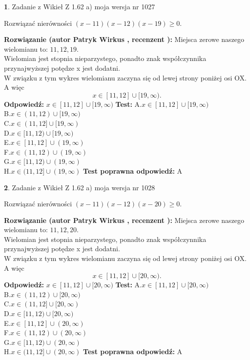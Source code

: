 \documentclass[12pt, a4paper]{article}
\theoremstyle{definition} %
\newtheorem{zad}{}
\newcommand{\zadStart}[1]{\begin{zad}#1\newline}
\newcommand{\zadStop}{\end{zad}}
\newcommand{\rozwStart}[2]{\noindent \textbf{Rozwiązanie (autor #1 , recenzent #2): }\newline}
\newcommand{\rozwStop}{\newline}
\newcommand{\odpStart}{\noindent \textbf{Odpowiedź:}\newline}
\newcommand{\odpStop}{\newline}
\newcommand{\testStart}{\noindent \textbf{Test:}\newline}
\newcommand{\testStop}{\newline}
\newcommand{\kluczStart}{\noindent \textbf{Test poprawna odpowiedź:}\newline}
\newcommand{\kluczStop}{\newline}
\begin{document}
\zadStart{Zadanie z Wikieł Z 1.62 a) moja wersja nr 1027}

Rozwiązać nierówności $(x-11)(x-12)(x-19)\ge0$.
\zadStop
\rozwStart{Patryk Wirkus}{}
Miejsca zerowe naszego wielomianu to: $11, 12, 19$.\\
Wielomian jest stopnia nieparzystego, ponadto znak współczynnika przy\linebreak najwyższej potędze x jest dodatni.\\ W związku z tym wykres wielomianu zaczyna się od lewej strony poniżej osi OX. A więc $$x \in [11,12] \cup [19,\infty).$$
\rozwStop
\odpStart
$x \in [11,12] \cup [19,\infty)$
\odpStop
\testStart
A.$x \in [11,12] \cup [19,\infty)$\\
B.$x \in (11,12) \cup [19,\infty)$\\
C.$x \in (11,12] \cup [19,\infty)$\\
D.$x \in [11,12) \cup [19,\infty)$\\
E.$x \in [11,12] \cup (19,\infty)$\\
F.$x \in (11,12) \cup (19,\infty)$\\
G.$x \in [11,12) \cup (19,\infty)$\\
H.$x \in (11,12] \cup (19,\infty)$
\testStop
\kluczStart
A
\kluczStop



\zadStart{Zadanie z Wikieł Z 1.62 a) moja wersja nr 1028}

Rozwiązać nierówności $(x-11)(x-12)(x-20)\ge0$.
\zadStop
\rozwStart{Patryk Wirkus}{}
Miejsca zerowe naszego wielomianu to: $11, 12, 20$.\\
Wielomian jest stopnia nieparzystego, ponadto znak współczynnika przy\linebreak najwyższej potędze x jest dodatni.\\ W związku z tym wykres wielomianu zaczyna się od lewej strony poniżej osi OX. A więc $$x \in [11,12] \cup [20,\infty).$$
\rozwStop
\odpStart
$x \in [11,12] \cup [20,\infty)$
\odpStop
\testStart
A.$x \in [11,12] \cup [20,\infty)$\\
B.$x \in (11,12) \cup [20,\infty)$\\
C.$x \in (11,12] \cup [20,\infty)$\\
D.$x \in [11,12) \cup [20,\infty)$\\
E.$x \in [11,12] \cup (20,\infty)$\\
F.$x \in (11,12) \cup (20,\infty)$\\
G.$x \in [11,12) \cup (20,\infty)$\\
H.$x \in (11,12] \cup (20,\infty)$
\testStop
\kluczStart
A
\kluczStop
\end{document}
